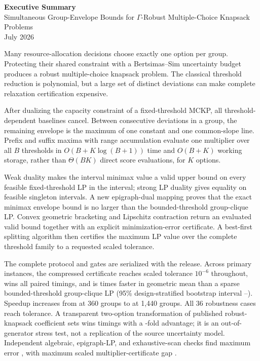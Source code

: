 \documentclass[11pt]{article}
\begin{document}
\begin{center}
{\large\bfseries Executive Summary}\\[0.35em]
{\normalsize Simultaneous Group-Envelope Bounds for $\Gamma$-Robust Multiple-Choice Knapsack Problems}\\[0.35em]
{\small July 2026}
\end{center}

Many resource-allocation decisions choose exactly one option per group.  Protecting their shared constraint with a Bertsimas--Sim uncertainty budget produces a robust multiple-choice knapsack problem.  The classical threshold reduction is polynomial, but a large set of distinct deviations can make complete relaxation certification expensive.

After dualizing the capacity constraint of a fixed-threshold MCKP, all threshold-dependent baselines cancel.  Between consecutive deviations in a group, the remaining envelope is the maximum of one constant and one common-slope line.  Prefix and suffix maxima with range accumulation evaluate one multiplier over all $B$ thresholds in $O(B+K\log(B+1))$ time and $O(B+K)$ working storage, rather than $\Theta(BK)$ direct score evaluations, for $K$ options.

Weak duality makes the interval minimax value a valid upper bound on every feasible fixed-threshold LP in the interval; strong LP duality gives equality on feasible singleton intervals.  A new epigraph-dual mapping proves that the exact minimax envelope bound is no larger than the bounded-threshold group-clique LP.  Convex geometric bracketing and Lipschitz contraction return an evaluated valid bound together with an explicit minimization-error certificate.  A best-first splitting algorithm then certifies the maximum LP value over the complete threshold family to a requested scaled tolerance.

The complete protocol and gates are serialized with the release.  Across \PubPrimaryCases{} primary instances, the compressed certificate reaches scaled tolerance $10^{-6}$ throughout, wins all \PubPrimaryWins{} paired timings, and is \PubPrimaryGeoSpeedup{} times faster in geometric mean than a sparse bounded-threshold group-clique LP (95\% design-stratified bootstrap interval \PubPrimaryCILow--\PubPrimaryCIHigh).  Speedup increases from \PubPrimaryNLowSpeedup{} at 360 groups to \PubPrimaryNHighSpeedup{} at 1,440 groups.  All 36 robustness cases reach tolerance.  A transparent two-option transformation of \PubExternalCases{} published robust-knapsack coefficient sets wins \PubExternalWins{} timings with a \PubExternalGeoSpeedup-fold advantage; it is an out-of-generator stress test, not a replication of the source uncertainty model.  Independent algebraic, epigraph-LP, and exhaustive-scan checks find maximum error \PubValidationMaxError, with maximum scaled multiplier-certificate gap \PubValidationCertGap.
\end{document}
